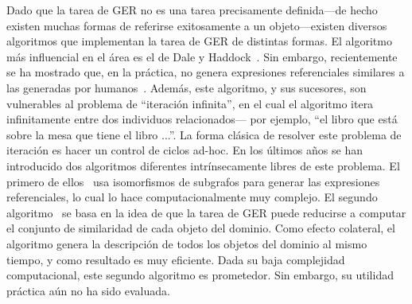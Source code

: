 Dado que la tarea de GER no es una tarea precisamente definida---de hecho existen muchas formas de referirse exitosamente a un objeto---existen diversos algoritmos que implementan la tarea de GER de distintas formas. El algoritmo m\'as influencial en el \'area es el de Dale y Haddock~\cite{DaleRobertandHaddock1991}. Sin embargo, recientemente se ha mostrado que, en la pr\'actica, no genera expresiones referenciales similares a las generadas por humanos~\cite{Dale2009}. Adem\'as, este algoritmo, y sus sucesores, son vulnerables al problema de ``iteraci\'on infinita'', en el cual el algoritmo itera infinitamente entre dos individuos relacionados--- por ejemplo, ``el libro que est\'a sobre la mesa que tiene el libro ...''.  La forma cl\'asica de resolver este problema de iteraci\'on es hacer un control de ciclos ad-hoc. En los \'ultimos a\~nos se han introducido dos algoritmos diferentes intr\'insecamente libres de este problema. El primero de ellos~\cite{Krahmer2003} usa isomorfismos de subgrafos para generar las expresiones referenciales, lo cual lo hace computacionalmente muy complejo. El segundo algoritmo~\cite{Areces2008} se basa en la idea de que la tarea de GER puede reducirse a computar el conjunto de similaridad de cada objeto del dominio. Como efecto colateral, el algoritmo genera la descripci\'on de todos los objetos del dominio al mismo tiempo, y como resultado es muy eficiente. Dada su baja complejidad computacional, este segundo algoritmo es prometedor. Sin embargo, su utilidad pr\'actica a\'un no ha sido evaluada.  


   




 

